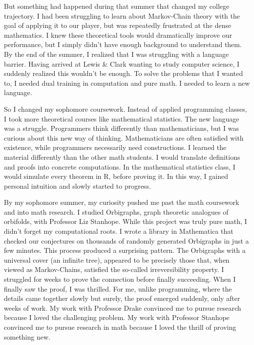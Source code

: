 \documentclass[12pt]{article}
\begin{document}
But something had happened during that summer that changed my college trajectory. I had been struggling to learn about Markov-Chain theory with the goal of applying it to our player, but was repeatedly frustrated at the dense mathematics. I knew these theoretical tools would dramatically improve our performance, but I simply didn't have enough background to understand them. By the end of the summer, I realized that I was struggling with a language barrier. Having arrived at Lewis \& Clark wanting to study computer science, I suddenly realized this wouldn't be enough. To solve the problems that I wanted to, I needed dual training in computation and pure math. I needed to learn a new language.

So I changed my sophomore coursework. Instead of applied programming classes, I took more theoretical courses like mathematical statistics. The new language was a struggle. Programmers think differently than mathematicians, but I was curious about this new way of thinking. Mathematicians are often satisfied with existence, while programmers necessarily need constructions. I learned the material differently than the other math students. I would translate definitions and proofs into concrete computations. In the mathematical statistics class, I would simulate every theorem in R, before proving it. In this way, I gained personal intuition and slowly started to progress.

By my sophomore summer, my curiosity pushed me past the math coursework and into math research. I studied Orbigraphs, graph theoretic analogues of orbifolds, with Professor Liz Stanhope. While this project was truly pure math, I didn't forget my computational roots. I wrote a library in Mathematica that checked our conjectures on thousands of randomly generated Orbigraphs in just a few minutes. This process produced a surprising pattern. The Orbigraphs with a universal cover (an infinite tree), appeared to be precisely those that, when viewed as Markov-Chains, satisfied the so-called irreversibility property. I struggled for weeks to prove the connection before finally succeeding. When I finally saw the proof, I was thrilled. For me, unlike programming, where the details came together slowly but surely, the proof emerged suddenly, only after weeks of work. My work with Professor Drake convinced me to pursue research because I loved the challenging problem. My work with Professor Stanhope convinced me to pursue research in math because I loved the thrill of proving something new.
\end{document}
